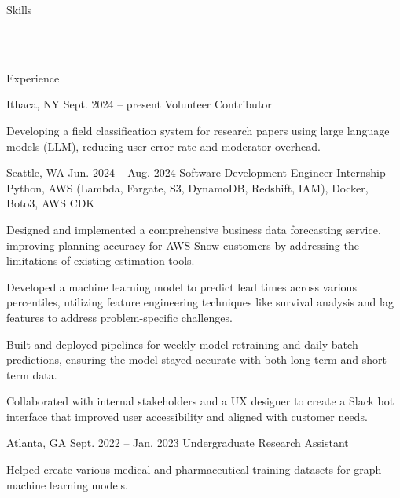 \documentclass[10pt]{article}
\begin{document}
\pagestyle{empty}

 
\begin{customsectionnoskip}{Skills}

     \\ 
     \\ 

\end{customsectionnoskip}

\begin{customsection}{Experience}

    {Ithaca, NY} 
    {Sept. 2024 -- present}
    {Volunteer Contributor}
    {}
    {
        \item Developing a field classification system for research papers using large language models (LLM), reducing user error rate and moderator overhead.
    }

    {Seattle, WA} 
    {Jun. 2024 -- Aug. 2024}
    {Software Development Engineer Internship}
    {Python, AWS (Lambda, Fargate, S3, DynamoDB, Redshift, IAM), Docker, Boto3, AWS CDK}
    {
        \item Designed and implemented a comprehensive business data forecasting service, improving planning accuracy for AWS Snow customers by addressing the limitations of existing estimation tools.
        \item Developed a machine learning model to predict lead times across various percentiles, utilizing feature engineering techniques like survival analysis and lag features to address problem-specific challenges.
        \item Built and deployed pipelines for weekly model retraining and daily batch predictions, ensuring the model stayed accurate with both long-term and short-term data.
        \item Collaborated with internal stakeholders and a UX designer to create a Slack bot interface that improved user accessibility and aligned with customer needs.
    }

    {Atlanta, GA} 
    {Sept. 2022 -- Jan. 2023}
    {Undergraduate Research Assistant}
    {}
    {
        \item Helped create various medical and pharmaceutical training datasets for graph machine learning models.
    }
    
\end{customsection}
\end{document}
